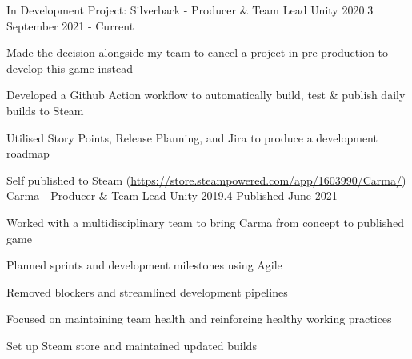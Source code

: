 

\begin{cventries}

    \cventry
    {In Development}
    {Project: Silverback - Producer \& Team Lead}
    {Unity 2020.3}
    {September 2021 - Current}
    {
        \begin{cvitems}
            \item Made the decision alongside my team to cancel a project in pre-production to develop this game instead
            \item Developed a Github Action workflow to automatically build, test \& publish daily builds to Steam
            \item Utilised Story Points, Release Planning, and Jira to produce a development roadmap
        \end{cvitems}  
    }


    \cventry
    {Self published to Steam (\href{https://store.steampowered.com/app/1603990/Carma/}{https://store.steampowered.com/app/1603990/Carma/})}
    {Carma - Producer \& Team Lead}
    {Unity 2019.4}
    {Published June 2021}
    {
        \begin{cvitems}
            \item Worked with a multidisciplinary team to bring Carma from concept to published game
            \item Planned sprints and development milestones using Agile
            \item Removed blockers and streamlined development pipelines
            \item Focused on maintaining team health and reinforcing healthy working practices
            \item Set up Steam store and maintained updated builds
        \end{cvitems}
    }


\end{cventries}
